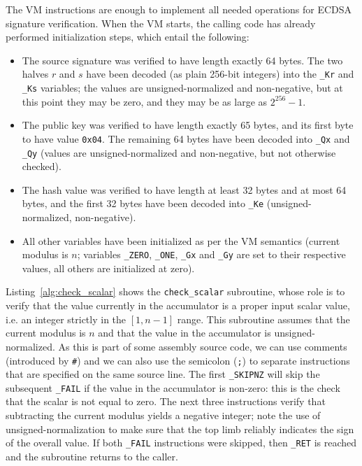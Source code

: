 \documentclass{llncs}
\begin{document}
The VM instructions are enough to implement all needed operations for
ECDSA signature verification. When the VM starts, the calling code
has already performed initialization steps, which entail the following:
\begin{itemize}

    \item The source signature was verified to have length exactly
    64 bytes. The two halves $r$ and $s$ have been decoded (as plain
    256-bit integers) into the \verb+_Kr+ and \verb+_Ks+ variables;
    the values are unsigned-normalized and non-negative, but at this
    point they may be zero, and they may be as large as $2^{256}-1$.

    \item The public key was verified to have length exactly 65 bytes,
    and its first byte to have value \verb+0x04+. The remaining 64 bytes
    have been decoded into \verb+_Qx+ and \verb+_Qy+ (values are
    unsigned-normalized and non-negative, but not otherwise checked).

    \item The hash value was verified to have length at least 32 bytes
    and at most 64 bytes, and the first 32 bytes have been decoded into
    \verb+_Ke+ (unsigned-normalized, non-negative).

    \item All other variables have been initialized as per the VM
    semantics (current modulus is $n$; variables \verb+_ZERO+,
    \verb+_ONE+, \verb+_Gx+ and \verb+_Gy+ are set to their respective
    values, all others are initialized at zero).

\end{itemize}

Listing~\ref{alg:check_scalar} shows the \verb+check_scalar+ subroutine,
whose role is to verify that the value currently in the accumulator is
a proper input scalar value, i.e. an integer strictly in the $[1,n-1]$
range. This subroutine assumes that the current modulus is $n$ and that
the value in the accumulator is unsigned-normalized. As this is part of
some assembly source code, we can use comments (introduced by \verb+#+)
and we can also use the semicolon (\verb+;+) to separate instructions
that are specified on the same source line. The first \verb+_SKIPNZ+
will skip the subsequent \verb+_FAIL+ if the value in the accumulator
is non-zero: this is the check that the scalar is not equal to zero.
The next three instructions verify that subtracting the current modulus
yields a negative integer; note the use of unsigned-normalization to
make sure that the top limb reliably indicates the sign of the overall
value. If both \verb+_FAIL+ instructions were skipped, then \verb+_RET+
is reached and the subroutine returns to the caller.
\end{document}
